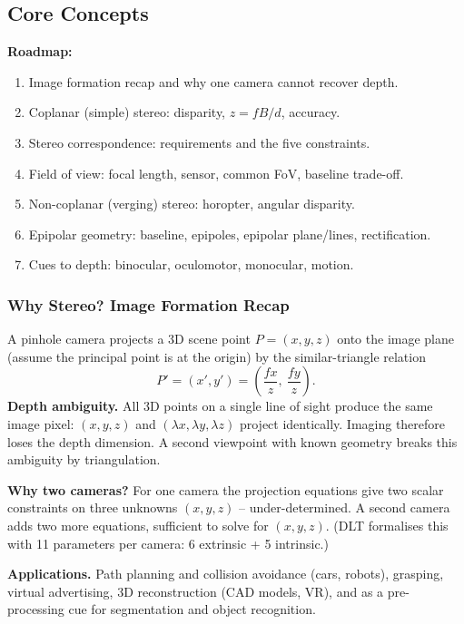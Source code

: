 \subsection{Core Concepts}

\textbf{Roadmap:}
\begin{enumerate}
  \item Image formation recap and why one camera cannot recover depth.
  \item Coplanar (simple) stereo: disparity, $z = fB/d$, accuracy.
  \item Stereo correspondence: requirements and the five constraints.
  \item Field of view: focal length, sensor, common FoV, baseline trade-off.
  \item Non-coplanar (verging) stereo: horopter, angular disparity.
  \item Epipolar geometry: baseline, epipoles, epipolar plane/lines, rectification.
  \item Cues to depth: binocular, oculomotor, monocular, motion.
\end{enumerate}

\bigseparator

\subsubsection{Why Stereo? Image Formation Recap}

A pinhole camera projects a 3D scene point $P=(x,y,z)$ onto the image plane (assume the principal point is at the origin) by the similar-triangle relation
\[
P' = (x', y') = \left(\frac{f x}{z},\ \frac{f y}{z}\right).
\]
\textbf{Depth ambiguity.} All 3D points on a single line of sight produce the same image pixel: $(x,y,z)$ and $(\lambda x, \lambda y, \lambda z)$ project identically. Imaging therefore loses the depth dimension. A second viewpoint with known geometry breaks this ambiguity by triangulation.

\textbf{Why two cameras?} For one camera the projection equations give two scalar constraints on three unknowns $(x,y,z)$ -- under-determined. A second camera adds two more equations, sufficient to solve for $(x,y,z)$. (DLT formalises this with 11 parameters per camera: 6 extrinsic + 5 intrinsic.)

\textbf{Applications.} Path planning and collision avoidance (cars, robots), grasping, virtual advertising, 3D reconstruction (CAD models, VR), and as a pre-processing cue for segmentation and object recognition.

